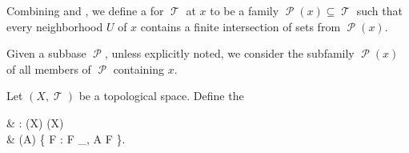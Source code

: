\begin{definition}\label{def:topological_local_subbase}
  Combining  and , we define a  for \( \mscrT \) at \( x \) to be a family \( \mscrP(x) \subseteq \mscrT \) such that every neighborhood \( U \) of \( x \) contains a finite intersection of sets from \( \mscrP(x) \).

  Given a subbase \( \mscrP \), unless explicitly noted, we consider the subfamily \( \mscrP(x) \) of all members of \( \mscrP \) containing \( x \).
\end{definition}

\begin{definition}\label{def:closure_operator}
  Let \( (X, \mscrT) \) be a topological space. Define the 
  \begin{BreakableAlign*}
     & \Cl: \Pow(X) \to \Pow(X)                                           \\
     & \Cl(A) \coloneqq \bigcap \{ F : F \in \mscrF_\mscrT, A \subseteq F \}.
  \end{BreakableAlign*}
\end{definition}

